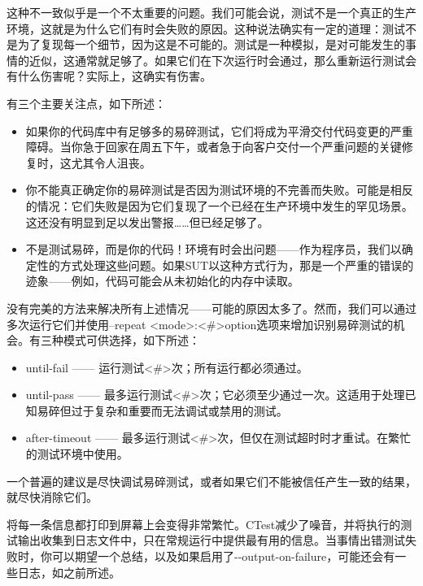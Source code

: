 这种不一致似乎是一个不太重要的问题。我们可能会说，测试不是一个真正的生产环境，这就是为什么它们有时会失败的原因。这种说法确实有一定的道理：测试不是为了复现每一个细节，因为这是不可能的。测试是一种模拟，是对可能发生的事情的近似，这通常就足够了。如果它们在下次运行时会通过，那么重新运行测试会有什么伤害呢？实际上，这确实有伤害。

有三个主要关注点，如下所述：

\begin{itemize}
\item
如果你的代码库中有足够多的易碎测试，它们将成为平滑交付代码变更的严重障碍。当你急于回家在周五下午，或者急于向客户交付一个严重问题的关键修复时，这尤其令人沮丧。

\item
你不能真正确定你的易碎测试是否因为测试环境的不完善而失败。可能是相反的情况：它们失败是因为它们复现了一个已经在生产环境中发生的罕见场景。这还没有明显到足以发出警报……但已经足够了。

\item
不是测试易碎，而是你的代码！环境有时会出问题——作为程序员，我们以确定性的方式处理这些问题。如果SUT以这种方式行为，那是一个严重的错误的迹象——例如，代码可能会从未初始化的内存中读取。
\end{itemize}

没有完美的方法来解决所有上述情况——可能的原因太多了。然而，我们可以通过多次运行它们并使用–repeat <mode>:<\#>option选项来增加识别易碎测试的机会。有三种模式可供选择，如下所述：

\begin{itemize}
\item
until-fail —— 运行测试<\#>次；所有运行都必须通过。

\item
until-pass —— 最多运行测试<\#>次；它必须至少通过一次。这适用于处理已知易碎但过于复杂和重要而无法调试或禁用的测试。

\item
after-timeout —— 最多运行测试<\#>次，但仅在测试超时时才重试。在繁忙的测试环境中使用。
\end{itemize}

一个普遍的建议是尽快调试易碎测试，或者如果它们不能被信任产生一致的结果，就尽快消除它们。


将每一条信息都打印到屏幕上会变得非常繁忙。CTest减少了噪音，并将执行的测试输出收集到日志文件中，只在常规运行中提供最有用的信息。当事情出错测试失败时，你可以期望一个总结，以及如果启用了-{}-output-on-failure，可能还会有一些日志，如之前所述。

